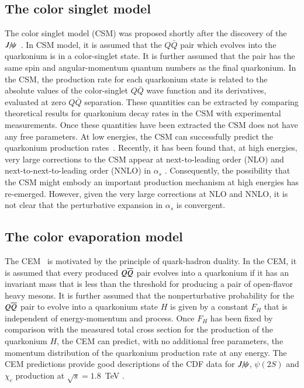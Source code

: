 \subsection{The color singlet model}


The color singlet model (CSM) was proposed shortly after the discovery of the 
$J\hspace{-.08em}/\hspace{-.14em}\psi$~\cite{Einhorn:1975ua,Berger:1980ni,Ellis:1976fj,Carlson:1976cd}.
In CSM model, it is assumed that the $Q\bar Q$ pair which evolves into
the quarkonium is in a color-singlet state. It is further assumed that  the pair  has the same spin
and angular-momentum quantum numbers as the final quarkonium. In the CSM, the
production rate for each quarkonium state is related to the absolute
values of the color-singlet $Q\bar Q$ wave function and its derivatives,
evaluated at zero $Q\bar Q$ separation. These quantities can be
extracted by comparing theoretical results for quarkonium decay
rates in the CSM with experimental measurements. Once these quantities 
have been extracted the CSM  does not have any free parameters. At low energies, the CSM can 
successfully  predict the quarkonium production rates~\cite{Schuler:1994hy}. Recently, it has been found that, at high
energies, very large corrections to the CSM appear at next-to-leading
order (NLO) and next-to-next-to-leading order (NNLO) in $\alpha_s$
\cite{Artoisenet:2007xi,Campbell:2007ws,Artoisenet:2008fc}.
Consequently, the possibility that the CSM might embody an important 
production mechanism at high energies has re-emerged. 
However, given the very large corrections at
NLO and NNLO, it is not clear that the perturbative expansion in
$\alpha_s$ is convergent. 

\subsection{The color evaporation model}  
\label{prod_sec:CEM}

The CEM~\cite{Fritzsch:1977ay,Amundson:1995em,Amundson:1996qr}
is motivated by the principle of quark-hadron duality. In the CEM, it
is assumed that every produced $Q \overline{Q}$ pair evolves into a quarkonium
if it has an invariant mass that is less than the threshold for
producing a pair of open-flavor heavy mesons. It is further assumed that
the nonperturbative probability for the $Q \overline{Q}$ pair to evolve into a
quarkonium state $H$ is given by a constant $F_H$ that is independent of 
energy-momentum and process. Once $F_H$ has been fixed by
comparison with the measured total cross section for the production of
the quarkonium $H$, the CEM can predict, with no additional free
parameters, the momentum distribution of the quarkonium production rate
at any energy.
The CEM predictions provide good descriptions of the CDF data for $J\hspace{-.08em}/\hspace{-.14em}\psi$,
$\psi(2S)$ and $\chi_{c}$ production at $\sqrt{s}=1.8$~TeV
\cite{Amundson:1996qr}. 



